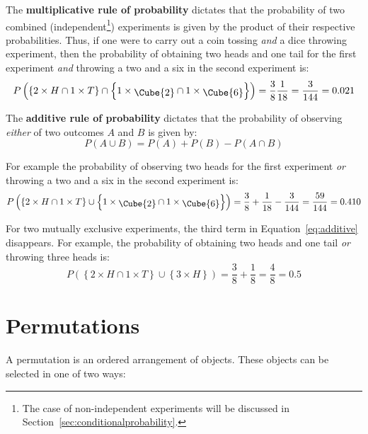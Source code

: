 The \textbf{multiplicative rule of
  probability}\label{page:multiplication} dictates that the
probability of two combined (independent\footnote{The case of
  non-independent experiments will be discussed in
  Section~\ref{sec:conditionalprobability}.}) experiments is given by
the product of their respective probabilities. Thus, if one were to
carry out a coin tossing \emph{and} a dice throwing experiment, then
the probability of obtaining two heads and one tail for the first
experiment \emph{and} throwing a two and a six in the second
experiment is:
\[
P\left(\left\{2\times{H} \cap 1\times{T}\right\} \cap
\left\{1\times\mbox{\raisebox{-2pt}{\Cube{2}}} \cap
1\times\mbox{\raisebox{-2pt}{\Cube{6}}}\right\}\right) =
\frac{3}{8}\frac{1}{18} = \frac{3}{144} = 0.021
\]

The \textbf{additive rule of probability}\label{page:addition}
dictates that the probability of observing \emph{either} of two
outcomes $A$ and $B$ is given by:
\begin{equation}
  P({A}\cup{B}) = P(A) + P(B) - P({A}\cap{B})
  \label{eq:additive}
\end{equation}

For example the probability of observing two heads for the first
experiment \emph{or} throwing a two and a six in the second experiment
is:
\[
P\left(\left\{2\times{H} \cap 1\times{T}\right\} \cup
\left\{1\times\mbox{\raisebox{-2pt}{\Cube{2}}} \cap
1\times\mbox{\raisebox{-2pt}{\Cube{6}}}\right\}\right) =
\frac{3}{8} + \frac{1}{18} - \frac{3}{144} = \frac{59}{144} = 0.410
\]

For two mutually exclusive experiments, the third term in
Equation~\ref{eq:additive} disappears. For example, the probability of
obtaining two heads and one tail \emph{or} throwing three heads is:
\[
P\left(\left\{2\times{H} \cap 1\times{T}\right\} \cup
\left\{3\times{H}\right\}\right) = \frac{3}{8} + \frac{1}{8} = \frac{4}{8} = 0.5
\]

\section{Permutations}
\label{sec:permutations}

A permutation is an ordered arrangement of objects. These objects can
be selected in one of two ways:

